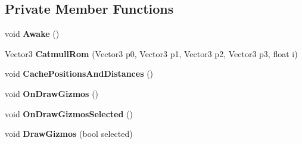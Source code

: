 \subsection*{Private Member Functions}
\begin{DoxyCompactItemize}
\item 
\mbox{\label{class_unity_standard_assets_1_1_utility_1_1_waypoint_circuit_aab5562ec7d393d158ccd1ef1c0149ba1}} 
void {\bfseries Awake} ()
\item 
\mbox{\label{class_unity_standard_assets_1_1_utility_1_1_waypoint_circuit_a261cd06b90b6bd32e69087d151164a28}} 
Vector3 {\bfseries Catmull\+Rom} (Vector3 p0, Vector3 p1, Vector3 p2, Vector3 p3, float i)
\item 
\mbox{\label{class_unity_standard_assets_1_1_utility_1_1_waypoint_circuit_ac8607bf9d7b81db94596a37a2a0fc221}} 
void {\bfseries Cache\+Positions\+And\+Distances} ()
\item 
\mbox{\label{class_unity_standard_assets_1_1_utility_1_1_waypoint_circuit_a4c184ccb373517c3451f5216e980e092}} 
void {\bfseries On\+Draw\+Gizmos} ()
\item 
\mbox{\label{class_unity_standard_assets_1_1_utility_1_1_waypoint_circuit_ac5f4f91cfcf388d25fe8be7581a7383a}} 
void {\bfseries On\+Draw\+Gizmos\+Selected} ()
\item 
\mbox{\label{class_unity_standard_assets_1_1_utility_1_1_waypoint_circuit_a1efd557e8483fe60bf221a2594a47099}} 
void {\bfseries Draw\+Gizmos} (bool selected)
\end{DoxyCompactItemize}

